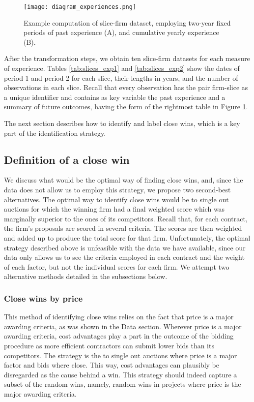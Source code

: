 \begin{figure}
  \texttt{[image: diagram\_experiences.png]}
  \caption{Example computation of slice-firm dataset, employing two-year fixed periods of past experience (A), and cumulative yearly experience (B).}
  \label{fig:diagram_experience}
  \vskip 0.5mm
  { \footnotesize  }
\end{figure}

After the transformation steps, we obtain ten slice-firm datasets for each measure of experience. Tables \ref{tab:slices_exp1} and \ref{tab:slices_exp2} show the dates of period 1 and period 2 for each slice, their lengths in years, and the number of observations in each slice. Recall that every observation has the pair firm-slice as a unique identifier and contains as key variable the past experience and a summary of future outcomes, having the form of the rightmost table in Figure \ref{fig:diagram_experience}.





The next section describes how to identify and label close wins, which is a key part of the identification strategy.

\subsection{Definition of a close win}
\label{section:findclosewins}
We discuss what would be the optimal way of finding close wins, and, since the data does not allow us to employ this strategy, we propose two second-best alternatives.
The optimal way to identify close wins would be to single out auctions for which the winning firm had a final weighted score which was marginally superior to the ones of its competitors.  Recall that, for each contract, the  firm's proposals are scored in several criteria. The scores are then weighted and added up to produce the total score for that firm. Unfortunately, the optimal strategy described above is unfeasible with the data we have available, since our data only allows us to see the criteria employed in each contract and the weight of each factor, but not the individual scores for each firm. We attempt two alternative methods detailed in the subsections below.

\subsubsection{Close wins by price}
This method of identifying close wins relies on the fact that price is a major awarding criteria, as was shown in the Data section. Wherever price is a major awarding criteria, cost advantages play a part in the outcome of the bidding procedure as more efficient contractors can submit lower bids than its competitors. The strategy is the to single out auctions where price is a major factor and bids where close. This way, cost advantages can plausibly be disregarded as the cause behind a win. This strategy should indeed capture a subset of the random wins, namely, random wins in projects where price is the major awarding criteria.

